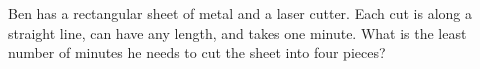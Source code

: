Ben has a rectangular sheet of metal and a laser cutter. Each cut is along a straight line, can have any length, and takes one minute. What is the least number of minutes he needs to cut the sheet into four pieces?
